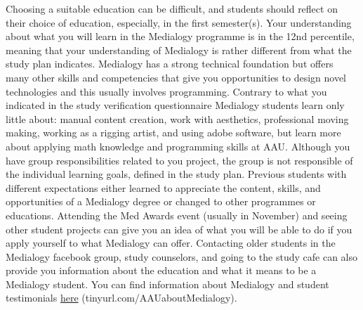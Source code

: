 \documentclass[]{article}
\begin{document}
Choosing a suitable education can be difficult, and students should
reflect on their choice of education, especially, in the first
semester(s). Your understanding about what you will learn in the
Medialogy programme is in the 12nd percentile, meaning that your
understanding of Medialogy is rather different from what the study plan
indicates. Medialogy has a strong technical foundation but offers many
other skills and competencies that give you opportunities to design
novel technologies and this usually involves programming. Contrary to
what you indicated in the study verification questionnaire Medialogy
students learn only little about: manual content creation, work with
aesthetics, professional moving making, working as a rigging artist, and
using adobe software, but learn more about applying math knowledge and
programming skills at AAU. Although you have group responsibilities
related to you project, the group is not responsible of the individual
learning goals, defined in the study plan. Previous students with
different expectations either learned to appreciate the content, skills,
and opportunities of a Medialogy degree or changed to other programmes
or educations. Attending the Med Awards event (usually in November) and
seeing other student projects can give you an idea of what you will be
able to do if you apply yourself to what Medialogy can offer. Contacting
older students in the Medialogy facebook group, study counselors, and
going to the study cafe can also provide you information about the
education and what it means to be a Medialogy student. You can find
information about Medialogy and student testimonials
\href{tinyurl.com/AAUaboutMedialogy}{here}
(tinyurl.com/AAUaboutMedialogy).
\end{document}
